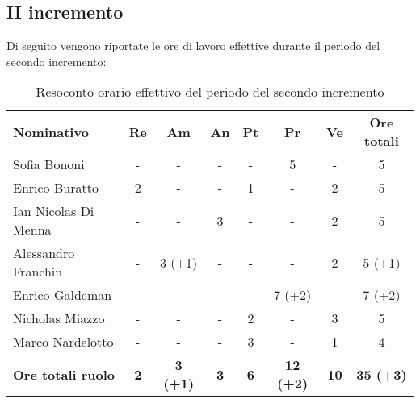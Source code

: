 \documentclass[../piano-di-progetto.tex]{subfiles}
\begin{document}
\subsection{II incremento}

Di seguito vengono riportate le ore di lavoro effettive durante il periodo del secondo incremento:
\begin{table}[H]
    \centering
    \begin{tabular}{lccccccc}
      \rowcolor{lightgray}
      \textbf{Nominativo}       & \textbf{Re}      & \textbf{Am} & \textbf{An}      & \textbf{Pt} & \textbf{Pr} & \textbf{Ve} & \textbf{Ore totali} \\
Sofia Bononi              & -          & -               & -          & -          & 5                & -           & 5                \\
Enrico Buratto            & 2          & -               & -          & 1          & -                & 2           & 5                \\
Ian Nicolas Di Menna      & -          & -               & 3          & -          & -                & 2           & 5                \\
Alessandro Franchin       & -          & 3 (+1)          & -          & -          & -                & 2           & 5 (+1)           \\
Enrico Galdeman           & -          & -               & -          & -          & 7 (+2)           & -           & 7 (+2)           \\
Nicholas Miazzo           & -          & -               & -          & 2          & -                & 3           & 5                \\
Marco Nardelotto          & -          & -               & -          & 3          & -                & 1           & 4                \\
\textbf{Ore totali ruolo} & \textbf{2} & \textbf{3 (+1)} & \textbf{3} & \textbf{6} & \textbf{12 (+2)} & \textbf{10} & \textbf{35 (+3)}

    \end{tabular}
    \caption{Resoconto orario effettivo del periodo del secondo incremento}
  \end{table}
\end{document}

